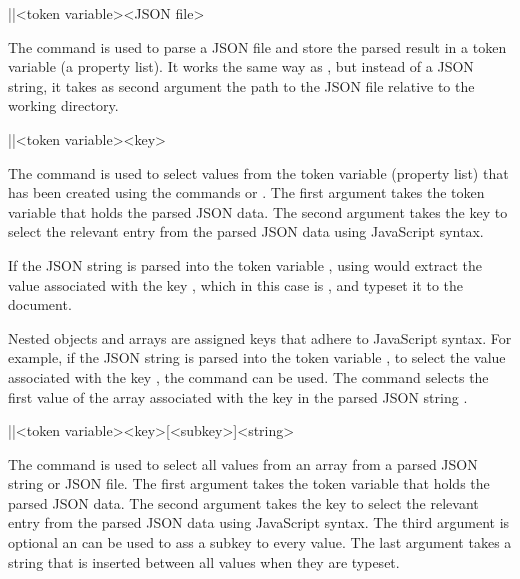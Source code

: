 \documentclass[a4paper]{article}
\begin{document}
\begin{macrodef}
|\JSONParseFromFile|{<token variable>}{<JSON file>}
\end{macrodef}
The command \macro{\JSONParseFromFile} is used to parse a JSON file and store the parsed result in a token variable (a property list). It works the same way as \macro{\JSONParse}, but instead of a JSON string, it takes as second argument the path to the JSON file relative to the working directory.

\begin{macrodef}
|\JSONParseGetValue|{<token variable>}{<key>}
\end{macrodef}
The command \macro{\JSONParseGetValue} is used to select values from the token variable (property list) that has been created using the commands \macro{\JSONParse} or \macro{\JSONParseFromFile}. The first argument takes the token variable that holds the parsed JSON data. The second argument takes the key to select the relevant entry from the parsed JSON data using JavaScript syntax.

If the JSON string  is parsed into the token variable \macro{\myJSONdata}, using  would extract the value associated with the key , which in this case is , and typeset it to the document.

Nested objects and arrays are assigned keys that adhere to JavaScript syntax. For example, if the JSON string  is parsed into the token variable \macro{\myJSONdata}, to select the value associated with the key , the command  can be used. The command  selects the first value of the array associated with the key  in the parsed JSON string .

\begin{macrodef}
|\JSONParseGetArrayValues|{<token variable>}{<key>}[<subkey>]{<string>}
\end{macrodef}
The command \macro{\JSONParseGetArrayValues} is used to select all values from an array from a parsed JSON string or JSON file. The first argument takes the token variable that holds the parsed JSON data. The second argument takes the key to select the relevant entry from the parsed JSON data using JavaScript syntax. The third argument is optional an can be used to ass a subkey to every value. The last argument takes a string that is inserted between all values when they are typeset.
\end{document}

